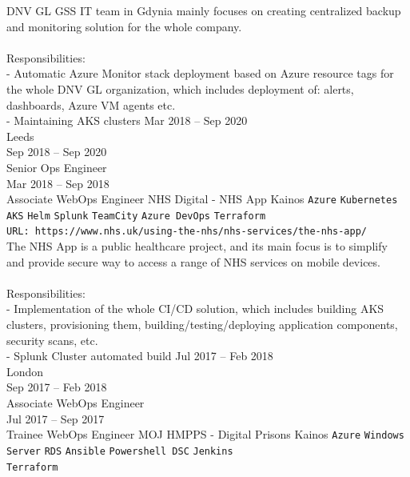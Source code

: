 \documentclass[9pt]{style/developercv}
\begin{document}
\begin{entrylist}
{      DNV GL GSS IT team in Gdynia mainly focuses on creating centralized backup and monitoring solution for the whole company.\\
      \\
      Responsibilities:\\
      - Automatic Azure Monitor stack deployment based on Azure resource tags for the whole DNV GL organization, which includes deployment of: alerts, dashboards, Azure VM agents etc.\\
      - Maintaining AKS clusters
		}
	\entry
    {Mar 2018 -- Sep 2020\\\footnotesize{Leeds}
    \\Sep 2018 -- Sep 2020\\\footnotesize{Senior Ops Engineer}
    \\Mar 2018 -- Sep 2018\\\footnotesize{Associate WebOps Engineer}}
		{NHS Digital - NHS App}
		{Kainos}
		{
			\texttt{Azure}\slashsep
      \texttt{Kubernetes}\slashsep
      \texttt{AKS}\slashsep
			\texttt{Helm}\slashsep
			\texttt{Splunk}\slashsep
			\texttt{TeamCity}\slashsep
			\texttt{Azure DevOps}\slashsep
      \texttt{Terraform}\\
      \texttt{URL: https://www.nhs.uk/using-the-nhs/nhs-services/the-nhs-app/}\\

      The NHS App is a public healthcare project, and its main focus is to simplify and provide secure way to access a range of NHS services on mobile devices.\\
      \\
      Responsibilities:\\
      - Implementation of the whole CI/CD solution, which includes building AKS clusters, provisioning them, building/testing/deploying application components,
      security scans, etc.\\
      - Splunk Cluster automated build
		}
	\entry
    {Jul 2017 -- Feb 2018\\\footnotesize{London}
    \\Sep 2017 -- Feb 2018\\\footnotesize{Associate WebOps Engineer}
    \\Jul 2017 -- Sep 2017\\\footnotesize{Trainee WebOps Engineer}}
		{MOJ HMPPS - Digital Prisons}
		{Kainos}
		{
			\texttt{Azure}\slashsep
			\texttt{Windows Server}\slashsep
			\texttt{RDS}\slashsep
			\texttt{Ansible}\slashsep
			\texttt{Powershell DSC}\slashsep
      \texttt{Jenkins}\\
      \texttt{Terraform}\\

}
\end{entrylist}
\end{document}
